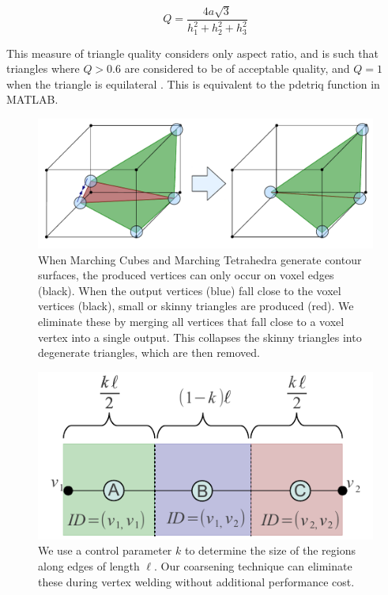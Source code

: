 \documentclass[journal]{vgtc}                %
\begin{document}
\begin{equation}
	Q = \frac{4a\sqrt{3}}{h_1^2 + h_2^2 + h_3^2}
\end{equation}

This measure of triangle quality considers only aspect ratio, and is such that triangles where $Q > 0.6$ are considered to be of acceptable quality, and $Q = 1$ when the triangle is equilateral \cite{Bank2003}. This is equivalent to the pdetriq function in MATLAB.

\begin{figure}[!ht]
\begin{center}
\includegraphics[height=0.5\columnwidth]{SkinnyCollapse}
\caption{When Marching Cubes and Marching Tetrahedra generate contour surfaces, the produced vertices can only occur on voxel edges (black). When the output vertices (blue) fall close to the voxel vertices (black), small or skinny triangles are produced (red). We eliminate these by merging all vertices that fall close to a voxel vertex into a single output. This collapses the skinny triangles into degenerate triangles, which are then removed. }
\label{fig:SkinnyCollapse}
\end{center}
\end{figure}


\begin{figure}[!ht]
\begin{center}
\includegraphics[height=0.5\columnwidth]{IDs}
\caption{We use a control parameter $k$ to determine the size of the regions along edges of length $\ell$. Our coarsening technique can eliminate these during vertex welding without additional performance cost.}
\label{fig:IDs}
\end{center}
\end{figure}
\end{document}
